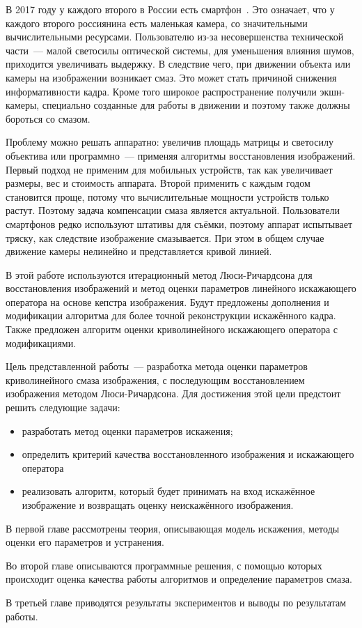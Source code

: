 \intro
В 2017 году у каждого второго в России есть смартфон~\cite{mobileUsers}. 
Это означает, что у каждого второго россиянина есть маленькая камера, со значительными вычислительными ресурсами. Пользователю из-за несовершенства технической части~--- малой светосилы оптической системы, для уменьшения влияния шумов, приходится увеличивать выдержку. В следствие чего, при движении объекта или камеры на изображении возникает смаз. Это может стать причиной снижения информативности кадра. Кроме того широкое распространение получили экшн-камеры, специально созданные для работы в движении и поэтому также должны бороться со смазом.

Проблему можно решать аппаратно: увеличив площадь матрицы и светосилу объектива или программно~--- применяя алгоритмы восстановления изображений. Первый подход не применим для мобильных устройств, так как увеличивает размеры, вес и стоимость аппарата. Второй применить с каждым годом становится проще, потому что вычислительные мощности устройств только растут. Поэтому задача компенсации смаза является актуальной.
Пользователи смартфонов редко используют штативы для съёмки, поэтому аппарат испытывает тряску, как следствие изображение смазывается. При этом в общем случае движение камеры нелинейно и представляется кривой линией.

В этой работе используются итерационный метод Люси-Ричардсона для восстановления изображений и метод оценки параметров линейного искажающего оператора на основе кепстра изображения. Будут предложены дополнения и модификации алгоритма для более точной реконструкции искажённого кадра. Также предложен алгоритм оценки криволинейного искажающего оператора с модификациями.

Цель представленной работы~--- разработка метода оценки параметров  криволинейного смаза изображения, с последующим восстановлением изображения методом Люси-Ричардсона. Для достижения этой цели предстоит решить следующие задачи:

\begin{itemize}
\item разработать метод оценки параметров искажения;
\item определить критерий качества восстановленного изображения и искажающего оператора
\item реализовать алгоритм, который будет принимать на вход искажённое изображение и возвращать оценку неискажённого изображения.
\end{itemize}

В первой главе рассмотрены теория, описывающая модель искажения, методы оценки его параметров и устранения.

Во второй главе описываются программные решения, с помощью которых происходит оценка качества работы алгоритмов и определение параметров смаза.

В третьей главе приводятся результаты экспериментов и выводы по результатам работы.